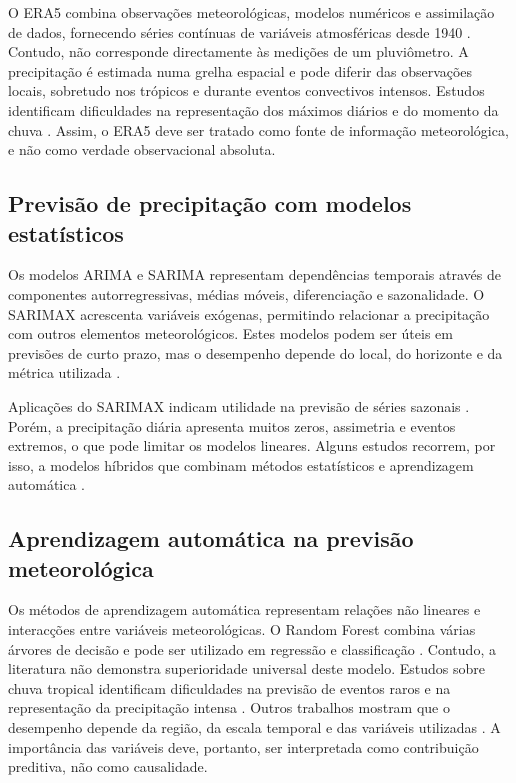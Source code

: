 \documentclass[9pt,twocolumn,twoside,english,portuguese]{opticajnl}
\begin{document}
O ERA5 combina observações meteorológicas, modelos numéricos e assimilação de
dados, fornecendo séries contínuas de variáveis atmosféricas desde 1940
\cite{Hersbach2020ERA5}. Contudo, não corresponde directamente às medições de
um pluviômetro. A precipitação é estimada numa grelha espacial e pode diferir
das observações locais, sobretudo nos trópicos e durante eventos convectivos
intensos. Estudos identificam dificuldades na representação dos máximos
diários e do momento da chuva \cite{Lavers2022ERA5precipitation,terblanche2022era5}.
Assim, o ERA5 deve ser tratado como fonte de informação meteorológica, e não
como verdade observacional absoluta.

\subsection{Previsão de precipitação com modelos estatísticos}

Os modelos ARIMA e SARIMA representam dependências temporais através de
componentes autorregressivas, médias móveis, diferenciação e sazonalidade. O
SARIMAX acrescenta variáveis exógenas, permitindo relacionar a precipitação
com outros elementos meteorológicos. Estes modelos podem ser úteis em
previsões de curto prazo, mas o desempenho depende do local, do horizonte e
da métrica utilizada \cite{Lai2020arima}.

Aplicações do SARIMAX indicam utilidade na previsão de séries sazonais
\cite{mulla2024sarimax}. Porém, a precipitação diária apresenta muitos zeros,
assimetria e eventos extremos, o que pode limitar os modelos lineares.
Alguns estudos recorrem, por isso, a modelos híbridos que combinam métodos
estatísticos e aprendizagem automática \cite{unnikrishnan2020hybrid}.

\subsection{Aprendizagem automática na previsão meteorológica}

Os métodos de aprendizagem automática representam relações não lineares e
interacções entre variáveis meteorológicas. O Random Forest combina várias
árvores de decisão e pode ser utilizado em regressão e classificação
\cite{Breiman2001RF}. Contudo, a literatura não demonstra superioridade
universal deste modelo. Estudos sobre chuva tropical identificam dificuldades
na previsão de eventos raros e na representação da precipitação intensa
\cite{Wang2021TropicalRainfall}. Outros trabalhos mostram que o desempenho
depende da região, da escala temporal e das variáveis utilizadas
\cite{Grazzini2024PrecipitationExtremes}. A importância das variáveis deve,
portanto, ser interpretada como contribuição preditiva, não como causalidade.
\end{document}
